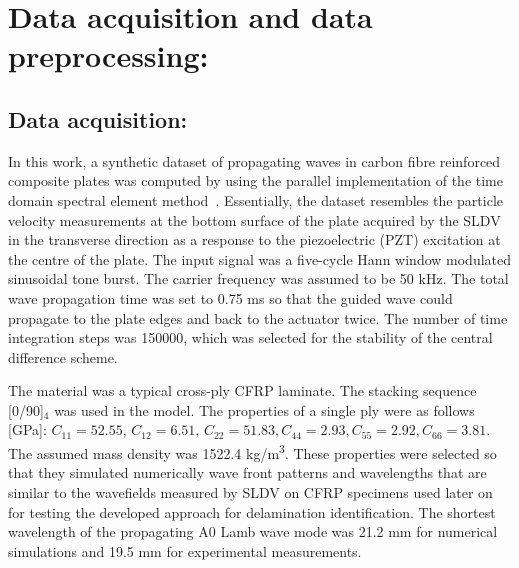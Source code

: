 \section{Data acquisition and data preprocessing:}
\subsection{Data acquisition:}
In this work, a synthetic dataset of propagating waves in carbon fibre 
reinforced composite plates was computed by using the parallel implementation 
of the time domain spectral element method~\cite{Kudela2020}. 
Essentially, the dataset resembles the particle velocity measurements at the 
bottom surface of the plate acquired by the SLDV in the transverse direction as 
a response to the piezoelectric (PZT) excitation at the centre of the plate. 
The input signal was a five-cycle Hann window modulated sinusoidal tone burst. 
The carrier frequency was assumed to be 50 kHz. 
The total wave propagation time was set to 0.75 ms so that the guided wave 
could propagate to the plate edges and back to the actuator twice.
The number of time integration steps was 150000, which was selected for the 
stability of the central difference scheme.

The material was a typical cross-ply CFRP laminate. 
The stacking sequence [0/90]\(_4\) was used in the model. 
The properties of a single ply were as follows [GPa]:
\(C_{11} = 52.55, \, C_{12} = 6.51, \, C_{22} = 51.83, C_{44} = 2.93, C_{55} = 
2.92, C_{66} = 3.81\). 
The assumed mass density was 1522.4 kg/m\textsuperscript{3}.
These properties were selected so that they simulated numerically wave front 
patterns and wavelengths that are similar to the wavefields measured by SLDV on 
CFRP specimens used later on for testing the developed approach for 
delamination identification.
The shortest wavelength of the propagating A0 Lamb wave mode was 21.2 mm for 
numerical simulations and 19.5 mm for experimental measurements.

